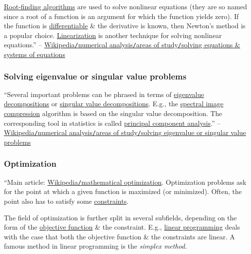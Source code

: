 \documentclass[oneside]{book}
\numberwithin{equation}{section}
\begin{document}
\href{https://en.wikipedia.org/wiki/Root-finding_algorithm}{Root-finding algorithms} are used to solve nonlinear equations (they are so named since a root of a function is an argument for which the function yields zero). If the function is \href{https://en.wikipedia.org/wiki/Derivative}{differentiable} \& the derivative is known, then Newton's method is a popular choice. \href{https://en.wikipedia.org/wiki/Linearization}{Linearization} is another technique for solving nonlinear equations.'' -- \href{https://en.wikipedia.org/wiki/Numerical_analysis#Solving_equations_and_systems_of_equations}{Wikipedia\texttt{/}numerical analysis\texttt{/}areas of study\texttt{/}solving equations \& systems of equations}

\subsubsection{Solving eigenvalue or singular value problems}
``Several important problems can be phrased in terms of \href{https://en.wikipedia.org/wiki/Eigenvalue_decomposition}{eigenvalue decompositions} or \href{https://en.wikipedia.org/wiki/Singular_value_decomposition}{singular value decompositions}. E.g., the \href{https://en.wikipedia.org/wiki/Image_compression}{spectral image compression} algorithm is based on the singular value decomposition. The corresponding tool in statistics is called \href{https://en.wikipedia.org/wiki/Principal_component_analysis}{principal component analysis}.'' -- \href{https://en.wikipedia.org/wiki/Numerical_analysis#Solving_eigenvalue_or_singular_value_problems}{Wikipedia\texttt{/}numerical analysis\texttt{/}areas of study\texttt{/}solving eigenvalue or singular value problems}

\subsubsection{Optimization}
``Main article: \href{https://en.wikipedia.org/wiki/Mathematical_optimization}{Wikipedia\texttt{/}mathematical optimization}. Optimization problems ask for the point at which a given function is maximized (or minimized). Often, the point also has to satisfy some \href{https://en.wikipedia.org/wiki/Constraint_(mathematics)}{constraints}.

The field of optimization is further split in several subfields, depending on the form of the \href{https://en.wikipedia.org/wiki/Objective_function}{objective function} \& the constraint. E.g., \href{https://en.wikipedia.org/wiki/Linear_programming}{linear programming} deals with the case that both the objective function \& the constraints are linear. A famous method in linear programming is the \textit{simplex method}.
\end{document}
